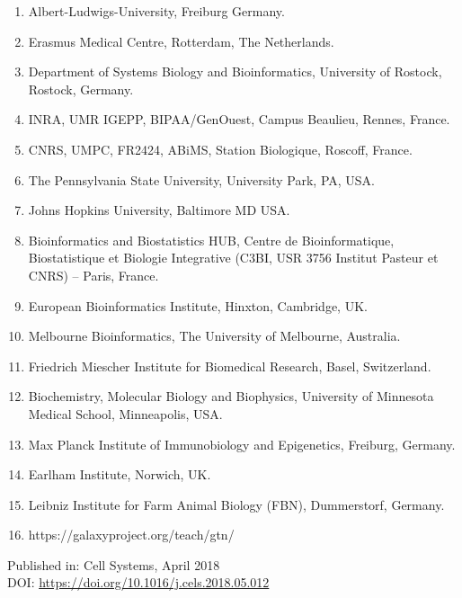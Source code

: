 \small
\begin{enumerate}
\itemsep-0.5em
\item Albert-Ludwigs-University, Freiburg  Germany. \label{affil:freiburg}
\item Erasmus Medical Centre, Rotterdam, The Netherlands. \label{affil:emc}
\item Department of Systems Biology and Bioinformatics, University of Rostock, Rostock, Germany. \label{affil:rostock}
\item INRA, UMR IGEPP, BIPAA/GenOuest, Campus Beaulieu, Rennes, France. \label{affil:abretaud}
\item CNRS, UMPC, FR2424, ABiMS, Station Biologique, Roscoff, France. \label{affil:roscoff}
\item The Pennsylvania State University, University Park, PA, USA. \label{affil:pennstate}
\item Johns Hopkins University, Baltimore MD USA. \label{affil:hopkins}
\item Bioinformatics and Biostatistics HUB, Centre de Bioinformatique, Biostatistique et Biologie Integrative (C3BI, USR 3756 Institut Pasteur et CNRS) – Paris, France. \label{affil:pasteur}
\item European Bioinformatics Institute, Hinxton, Cambridge, UK. \label{affil:ebi}
\item Melbourne Bioinformatics, The University of Melbourne, Australia. \label{affil:melbourne}
\item Friedrich Miescher Institute for Biomedical Research, Basel, Switzerland. \label{affil:basel}
\item Biochemistry, Molecular Biology and Biophysics, University of Minnesota Medical School, Minneapolis, USA. \label{affil:minnesota}
\item Max Planck Institute of Immunobiology and Epigenetics, Freiburg, Germany. \label{affil:maxplanck}
\item Earlham Institute, Norwich, UK. \label{affil:earlham}
\item Leibniz Institute for Farm Animal Biology (FBN), Dummerstorf, Germany. \label{affil:leibniz}
\item https://galaxyproject.org/teach/gtn/ \label{affil:gtn}


\end{enumerate}
\normalsize

Published in: Cell Systems, April 2018 \\
DOI: \url{https://doi.org/10.1016/j.cels.2018.05.012} \\

